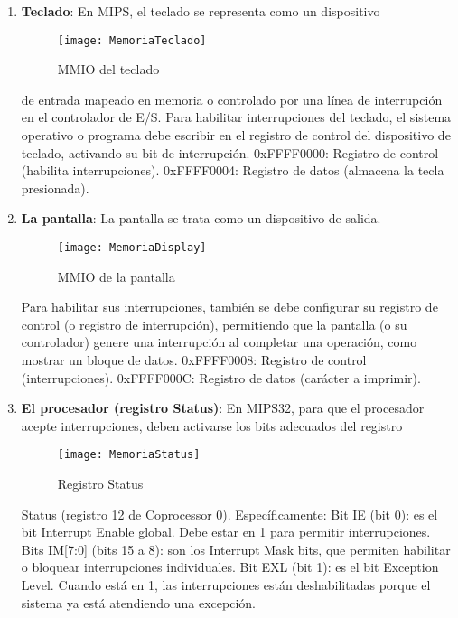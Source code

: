 \documentclass{article}
\begin{document}
\begin{enumerate}
  \item \begin{minipage}[t]{\linewidth}
      \textbf{Teclado}: En MIPS, el teclado se representa como un dispositivo
      
      \begin{wrapfigure}{r}{0.5\linewidth}
        \centering
        \texttt{[image: MemoriaTeclado]} 
        \caption{MMIO del teclado}
        \label{fig:ejemplo1}
      \end{wrapfigure}
      
      de entrada mapeado en memoria o controlado por una línea de interrupción en el controlador de E/S. Para habilitar interrupciones del teclado, el sistema operativo o programa debe escribir en el registro de control del dispositivo de teclado, activando su bit de interrupción. 0xFFFF0000: Registro de control (habilita interrupciones). 0xFFFF0004: Registro de datos (almacena la tecla presionada).
      \end{minipage}
  \item \begin{minipage}[t]{\linewidth}
      \textbf{La pantalla}: La pantalla se trata como un dispositivo de salida.
      
      \begin{wrapfigure}{l}{0.5\linewidth}
        \centering
        \texttt{[image: MemoriaDisplay]} 
        \caption{MMIO de la pantalla}
        \label{fig:ejemplo2}
      \end{wrapfigure}
    Para habilitar sus interrupciones, también se debe configurar su registro de control (o registro de interrupción), permitiendo que la pantalla (o su controlador) genere una interrupción al completar una operación, como mostrar un bloque de datos. 0xFFFF0008: Registro de control (interrupciones). 0xFFFF000C: Registro de datos (carácter a imprimir).
    \end{minipage}  
  \item \begin{minipage}[t]{\linewidth}
      \textbf{El procesador (registro Status)}: En MIPS32, para que el procesador acepte interrupciones, deben activarse los bits adecuados del registro
      
      \begin{wrapfigure}{r}{0.5\linewidth}
        \centering
        \texttt{[image: MemoriaStatus]} 
        \caption{Registro Status}
        \label{fig:ejemplo3}
      \end{wrapfigure}
      
     Status (registro 12 de Coprocessor 0). Específicamente: Bit IE (bit 0): es el bit Interrupt Enable global. Debe estar en 1 para permitir interrupciones. Bits IM[7:0] (bits 15 a 8): son los Interrupt Mask bits, que permiten habilitar o bloquear interrupciones individuales. Bit EXL (bit 1): es el bit Exception Level. Cuando está en 1, las interrupciones están deshabilitadas porque el sistema ya está atendiendo una excepción.
      \end{minipage}
\end{enumerate}
\end{document}
